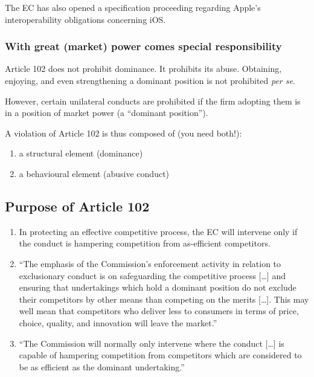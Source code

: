     The EC has also opened a specification proceeding regarding Apple’s interoperability obligations concerning iOS.

        \subsubsection{With great (market) power comes special responsibility}

            Article 102 does not prohibit dominance. It prohibits its abuse.
            Obtaining, enjoying, and even strengthening a dominant position
            is not prohibited \textit{per se}.
            
            However, certain unilateral conducts are prohibited if the firm
            adopting them is in a position of market power (a “dominant
            position”).
            
            A violation of Article 102 is thus composed of (you need both!):
            \begin{enumerate}
                \item a structural element (dominance)
                \item a behavioural element (abusive conduct)
            \end{enumerate}

    \subsection{Purpose of Article 102}

    \begin{enumerate}[label=\roman*.]
        \item In protecting an effective competitive process, the EC will intervene only if the conduct is hampering competition from as-efficient competitors.
        \item “The emphasis of the Commission's enforcement activity in relation to exclusionary conduct is on safeguarding the competitive process […] and ensuring that undertakings which hold a dominant position do not exclude their competitors by other means than competing on the merits […]. This may well mean that competitors who deliver less to consumers in terms of price, choice, quality, and innovation will leave the market.”
        \item “The Commission will normally only intervene where the conduct […] is capable of hampering competition from competitors which are considered to be as efficient as the dominant undertaking.”
    \end{enumerate}

